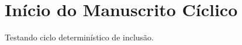 \documentclass{article}
\begin{document}
\section{Início do Manuscrito Cíclico}
Testando ciclo determinístico de inclusão.

\end{document}
